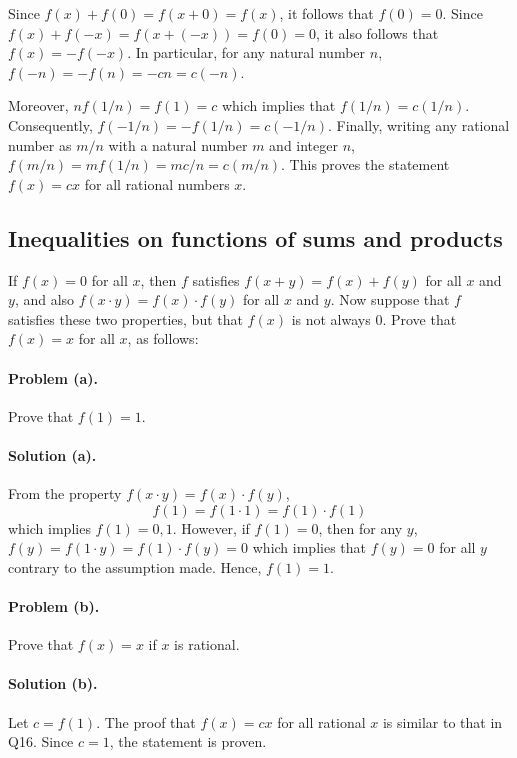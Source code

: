 \documentclass{article}
\begin{document}
Since $f(x) + f(0) = f(x + 0) = f(x)$, it follows that $f(0) = 0$. Since $f(x)
+ f(-x) = f(x + (-x)) = f(0) = 0$, it also follows that $f(x) = -f(-x)$. In
particular, for any natural number $n$, $f(-n) = -f(n) = -cn = c(-n)$.

Moreover, $nf(1/n) = f(1) = c$ which implies that $f(1/n) = c(1/n)$.
Consequently, $f(-1/n) = -f(1/n) = c(-1/n)$. Finally, writing any rational
number as $m/n$ with a natural number $m$ and integer $n$, $f(m/n) = mf(1/n) =
mc/n = c(m/n)$. This proves the statement $f(x) = cx$ for all rational numbers
$x$.

\setcounter{subsection}{16}
\subsection{Inequalities on functions of sums and products}

If $f(x) = 0$ for all $x$, then $f$ satisfies $f(x + y) = f(x) + f(y)$ for all
$x$ and $y$, and also $f(x \cdot y) = f(x) \cdot f(y)$ for all $x$ and $y$. Now
suppose that $f$ satisfies these two properties, but that $f(x)$ is not always
0. Prove that $f(x) = x$ for all $x$, as follows:

\paragraph{Problem (a).} Prove that $f(1) = 1$.

\paragraph{Solution (a).} From the property $f(x \cdot y) = f(x) \cdot f(y)$,
\begin{equation*}
  f(1) = f(1 \cdot 1) = f(1) \cdot f(1)
\end{equation*} which implies $f(1) = 0, 1$. However, if $f(1) = 0$, then for
any $y$, $f(y) = f(1 \cdot y) = f(1) \cdot f(y) = 0$ which implies that $f(y) =
0$ for all $y$ contrary to the assumption made. Hence, $f(1) = 1$.

\paragraph{Problem (b).} Prove that $f(x) = x$ if $x$ is rational.

\paragraph{Solution (b).} Let $c = f(1)$. The proof that $f(x) = cx$ for all
rational $x$ is similar to that in Q16. Since $c = 1$, the statement is proven.
\end{document}
